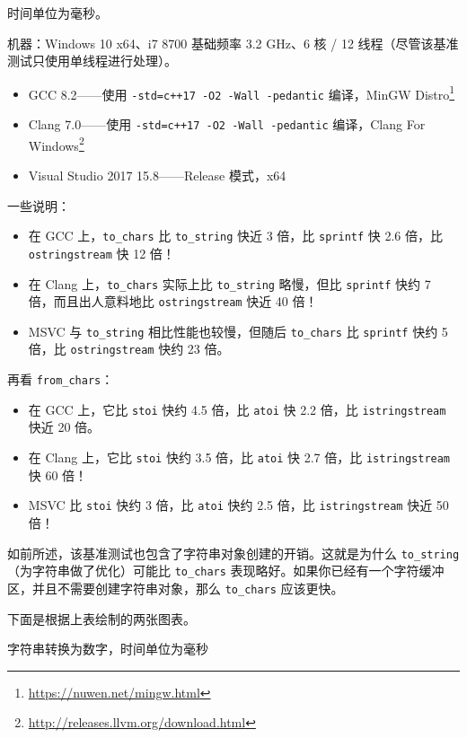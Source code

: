 时间单位为毫秒。

机器：Windows 10 x64、i7 8700 基础频率 3.2 GHz、6 核 / 12 线程（尽管该基准测试只使用单线程进行处理）。
\begin{itemize}
\item GCC 8.2——使用 \texttt{-std=c++17 -O2 -Wall -pedantic} 编译，MinGW Distro\footnote{\url{https://nuwen.net/mingw.html}}
\item Clang 7.0——使用 \texttt{-std=c++17 -O2 -Wall -pedantic} 编译，Clang For Windows\footnote{\url{http://releases.llvm.org/download.html}}
\item Visual Studio 2017 15.8——Release 模式，x64
\end{itemize}

一些说明：
\begin{itemize}
\item 在 GCC 上，\texttt{to\_chars} 比 \texttt{to\_string} 快近 3 倍，比 \texttt{sprintf} 快 2.6 倍，比 \texttt{ostringstream} 快 12 倍！
\item 在 Clang 上，\texttt{to\_chars} 实际上比 \texttt{to\_string} 略慢，但比 \texttt{sprintf} 快约 7 倍，而且出人意料地比 \texttt{ostringstream} 快近 40 倍！
\item MSVC 与 \texttt{to\_string} 相比性能也较慢，但随后 \texttt{to\_chars} 比 \texttt{sprintf} 快约 5 倍，比 \texttt{ostringstream} 快约 23 倍。
\end{itemize}

再看 \texttt{from\_chars}：
\begin{itemize}
\item 在 GCC 上，它比 \texttt{stoi} 快约 4.5 倍，比 \texttt{atoi} 快 2.2 倍，比 \texttt{istringstream} 快近 20 倍。
\item 在 Clang 上，它比 \texttt{stoi} 快约 3.5 倍，比 \texttt{atoi} 快 2.7 倍，比 \texttt{istringstream} 快 60 倍！
\item MSVC 比 \texttt{stoi} 快约 3 倍，比 \texttt{atoi} 快约 2.5 倍，比 \texttt{istringstream} 快近 50 倍！
\end{itemize}

如前所述，该基准测试也包含了字符串对象创建的开销。这就是为什么 \texttt{to\_string}（为字符串做了优化）可能比 \texttt{to\_chars} 表现略好。如果你已经有一个字符缓冲区，并且不需要创建字符串对象，那么 \texttt{to\_chars} 应该更快。

下面是根据上表绘制的两张图表。

字符串转换为数字，时间单位为毫秒


